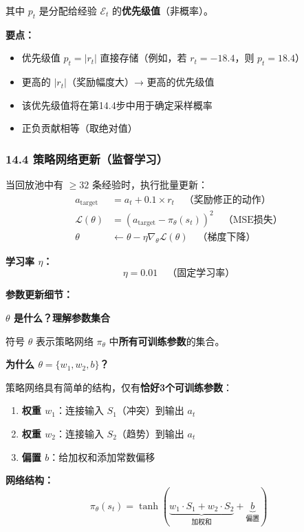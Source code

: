 \documentclass[11pt,a3paper]{ctexart}
\begin{document}
其中 $p_t$ 是分配给经验 $\mathcal{E}_t$ 的\textbf{优先级值}（非概率）。

\textbf{要点：}
\begin{itemize}
    \item 优先级值 $p_t = |r_t|$ 直接存储（例如，若 $r_t = -18.4$，则 $p_t = 18.4$）
    \item 更高的 $|r_t|$（奖励幅度大）→ 更高的优先级值
    \item 该优先级值将在第14.4步中用于确定采样概率
    \item 正负贡献相等（取绝对值）
\end{itemize}

\subsubsection*{14.4 策略网络更新（监督学习）}
当回放池中有 $\geq 32$ 条经验时，执行批量更新：
\begin{align}
a_{\text{target}} &= a_t + 0.1 \times r_t \quad \text{（奖励修正的动作）} \\
\mathcal{L}(\theta) &= (a_{\text{target}} - \pi_\theta(s_t))^2 \quad \text{（MSE损失）} \\
\theta &\leftarrow \theta - \eta \nabla_\theta \mathcal{L}(\theta) \quad \text{（梯度下降）}
\end{align}

\textbf{学习率 $\eta$：}
\begin{equation}
\eta = 0.01 \quad \text{（固定学习率）}
\end{equation}

\textbf{参数更新细节：}

\textbf{$\theta$ 是什么？理解参数集合}

符号 $\theta$ 表示策略网络 $\pi_\theta$ 中\textbf{所有可训练参数}的集合。

\textbf{为什么 $\theta = \{w_1, w_2, b\}$？}

策略网络具有简单的结构，仅有\textbf{恰好3个可训练参数}：

\begin{enumerate}
    \item \textbf{权重 $w_1$}：连接输入 $S_1$（冲突）到输出 $a_t$
    \item \textbf{权重 $w_2$}：连接输入 $S_2$（趋势）到输出 $a_t$
    \item \textbf{偏置 $b$}：给加权和添加常数偏移
\end{enumerate}

\textbf{网络结构：}
\begin{equation}
\pi_\theta(s_t) = \tanh(\underbrace{w_1 \cdot S_1 + w_2 \cdot S_2}_{\text{加权和}} + \underbrace{b}_{\text{偏置}})
\end{equation}
\end{document}
